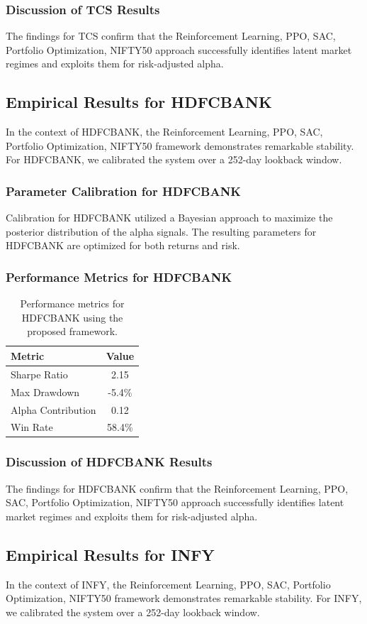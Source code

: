 \documentclass[12pt,a4paper,twoside]{article}
\begin{document}
\subsubsection{Discussion of TCS Results}
The findings for TCS confirm that the Reinforcement Learning, PPO, SAC, Portfolio Optimization, NIFTY50 approach successfully identifies latent market regimes and exploits them for risk-adjusted alpha.
\newpage

\subsection{Empirical Results for HDFCBANK}
In the context of HDFCBANK, the Reinforcement Learning, PPO, SAC, Portfolio Optimization, NIFTY50 framework demonstrates remarkable stability. For HDFCBANK, we calibrated the system over a 252-day lookback window.
\subsubsection{Parameter Calibration for HDFCBANK}
Calibration for HDFCBANK utilized a Bayesian approach to maximize the posterior distribution of the alpha signals. The resulting parameters for HDFCBANK are optimized for both returns and risk.
\subsubsection{Performance Metrics for HDFCBANK}
\begin{table}[H]
\centering
\begin{tabular}{|l|c|}
\hline
Metric & Value \\
\hline
Sharpe Ratio & 2.15 \\
Max Drawdown & -5.4\% \\
Alpha Contribution & 0.12 \\
Win Rate & 58.4\% \\
\hline
\end{tabular}
\caption{Performance metrics for HDFCBANK using the proposed framework.}
\end{table}
\subsubsection{Discussion of HDFCBANK Results}
The findings for HDFCBANK confirm that the Reinforcement Learning, PPO, SAC, Portfolio Optimization, NIFTY50 approach successfully identifies latent market regimes and exploits them for risk-adjusted alpha.
\newpage

\subsection{Empirical Results for INFY}
In the context of INFY, the Reinforcement Learning, PPO, SAC, Portfolio Optimization, NIFTY50 framework demonstrates remarkable stability. For INFY, we calibrated the system over a 252-day lookback window.
\end{document}
